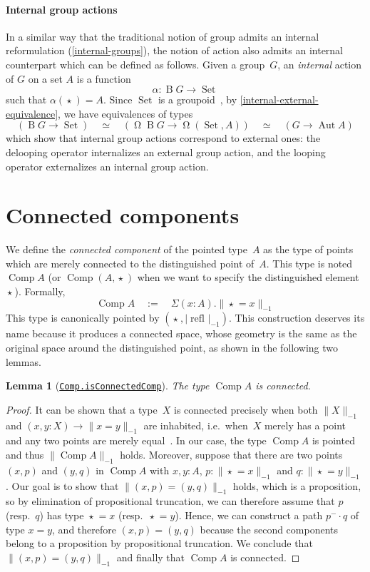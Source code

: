 \documentclass[10pt,a4paper]{amsart}
\newtheorem{lemma}[theorem]{Lemma}
\theoremstyle{definition}
\newcommand{\B}{\operatorname{B}} %
\newcommand{\pt}[1]{\star_{#1}} %
\newcommand{\trunc}[2]{\|#2\|_{#1}} %
\newcommand{\ptrunc}[1]{\trunc{-1}{#1}} %
\newcommand{\trunq}[2]{|#2|_{#1}} %
\newcommand{\ptrunq}[1]{\trunq{-1}{#1}} %
\newcommand{\defd}{:=} %
\newcommand{\qdefd}{\quad\defd\quad}
\newcommand{\refl}[1]{\operatorname{refl}_{#1}} %
\newcommand{\pcomp}{\cdot} %
\newcommand{\sym}[1]{#1^-} %
\newcommand{\equivto}{\simeq} %
\newcommand{\Aut}{\operatorname{Aut}} %
\newcommand{\Comp}{\operatorname{Comp}} %
\newcommand{\Loop}{\operatorname{\Omega}} %
\newcommand{\Set}{\operatorname{Set}} %
\newcommand{\ie}{i.e.~}
\newcommand{\resp}{resp.~}
\newcommand{\agda}[2]{\href{https://smimram.github.io/generated-deloopings-agda/#1.html\##2}{\texttt{#1.#2}}}
\newcommand{\TODO}[1]{\marginpar{\tiny #1}}
\newcommand{\EO}[1]{\TODO{EO: #1}}
\begin{document}
\paragraph{Internal group actions}
In a similar way that the traditional notion of group admits an internal
reformulation (\cref{internal-groups}), the notion of action also admits an
internal counterpart which can be defined as follows.
%
Given a group~$G$, an \emph{internal} action of $G$ on a set $A$ is a function
\[
  \alpha : \B G \to \Set
\]
such that $\alpha(\pt{})=A$. Since $\Set$ is a
groupoid~\cite[Theorem 7.1.11]{hottbook}, by
\cref{internal-external-equivalence}, we have equivalences of types
\[
  (\B G\to\Set)
  \quad\equivto\quad
  (\Loop\B G\to\Loop(\Set,A))
  \quad\equivto\quad
  (G\to\Aut A)
\]
which show that internal group actions correspond to external ones: the
delooping operator internalizes an external group action, and the looping
operator externalizes an internal group action.


\section{Connected components}
\label{connected-component}
We define the \emph{connected component} of the pointed type~$A$ as the type of
points which are merely connected to the distinguished point of~$A$. This type
is noted~$\Comp A$ (or $\Comp(A,\pt{})$ when we want to specify the
distinguished element~$\pt{}$). Formally,
\[
  \Comp A
  \qdefd
  \Sigma(x:A).\ptrunc{\pt{}=x}
\]
This type is canonically pointed by $(\pt{},\ptrunq{\refl{}})$.
%
This construction deserves its name because it produces a connected space, whose
geometry is the same as the original space around the distinguished point, as
shown in the following two lemmas.

\begin{lemma}[\agda{Comp}{isConnectedComp}]
  The type $\Comp A$ is connected.
\end{lemma}
\begin{proof}
  It can be shown that a type~$X$ is connected precisely when both $\ptrunc{X}$
  and $(x,y:X)\to\ptrunc{x=y}$ are inhabited, \ie when~$X$ merely has a point
  and any two points are merely equal~\cite[Exercise~7.6]{hottbook}.
  In our case, the type $\Comp A$ is pointed and thus $\ptrunc{\Comp A}$
  holds.
  Moreover, suppose that there are two points $(x,p)$ and $(y,q)$ in $\Comp A$
  with $x,y:A$, $p:\ptrunc{\pt{}=x}$ and $q:\ptrunc{\pt{}=y}$. Our goal is to
  show that $\ptrunc{(x,p)=(y,q)}$ holds, which is a proposition, so by
  elimination of propositional truncation, we can therefore assume that $p$
  (\resp $q$) has type $\pt{}=x$ (\resp $\pt{}=y$). Hence, we can construct a path
  $\sym p\pcomp q$ of type $x=y$, and therefore $(x,p)=(y,q)$ because the second
  components belong to a proposition by propositional truncation. We conclude
  that $\ptrunc{(x,p)=(y,q)}$ and finally that $\Comp A$ is connected.
\end{proof}
\end{document}
